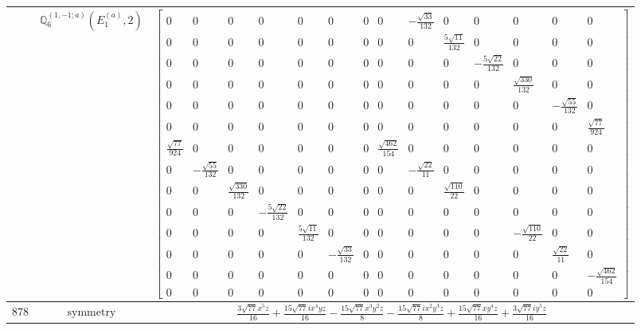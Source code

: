 \documentclass[fleqn,8pt,landscape]{jsarticle}
\begin{document}
\begin{longtable}{ccc}
$  $ & $ \mathbb{Q}_{6}^{(1,-1;a)}(E_{1}^{(a)},2) $ & $ \begin{bmatrix} 0 & 0 & 0 & 0 & 0 & 0 & 0 & 0 & - \frac{\sqrt{33}}{132} & 0 & 0 & 0 & 0 & 0 \\ 0 & 0 & 0 & 0 & 0 & 0 & 0 & 0 & 0 & \frac{5 \sqrt{11}}{132} & 0 & 0 & 0 & 0 \\ 0 & 0 & 0 & 0 & 0 & 0 & 0 & 0 & 0 & 0 & - \frac{5 \sqrt{22}}{132} & 0 & 0 & 0 \\ 0 & 0 & 0 & 0 & 0 & 0 & 0 & 0 & 0 & 0 & 0 & \frac{\sqrt{330}}{132} & 0 & 0 \\ 0 & 0 & 0 & 0 & 0 & 0 & 0 & 0 & 0 & 0 & 0 & 0 & - \frac{\sqrt{55}}{132} & 0 \\ 0 & 0 & 0 & 0 & 0 & 0 & 0 & 0 & 0 & 0 & 0 & 0 & 0 & \frac{\sqrt{77}}{924} \\ \frac{\sqrt{77}}{924} & 0 & 0 & 0 & 0 & 0 & 0 & \frac{\sqrt{462}}{154} & 0 & 0 & 0 & 0 & 0 & 0 \\ 0 & - \frac{\sqrt{55}}{132} & 0 & 0 & 0 & 0 & 0 & 0 & - \frac{\sqrt{22}}{11} & 0 & 0 & 0 & 0 & 0 \\ 0 & 0 & \frac{\sqrt{330}}{132} & 0 & 0 & 0 & 0 & 0 & 0 & \frac{\sqrt{110}}{22} & 0 & 0 & 0 & 0 \\ 0 & 0 & 0 & - \frac{5 \sqrt{22}}{132} & 0 & 0 & 0 & 0 & 0 & 0 & 0 & 0 & 0 & 0 \\ 0 & 0 & 0 & 0 & \frac{5 \sqrt{11}}{132} & 0 & 0 & 0 & 0 & 0 & 0 & - \frac{\sqrt{110}}{22} & 0 & 0 \\ 0 & 0 & 0 & 0 & 0 & - \frac{\sqrt{33}}{132} & 0 & 0 & 0 & 0 & 0 & 0 & \frac{\sqrt{22}}{11} & 0 \\ 0 & 0 & 0 & 0 & 0 & 0 & 0 & 0 & 0 & 0 & 0 & 0 & 0 & - \frac{\sqrt{462}}{154} \\ 0 & 0 & 0 & 0 & 0 & 0 & 0 & 0 & 0 & 0 & 0 & 0 & 0 & 0 \end{bmatrix} $ \\ \hline
$ 878 $ & $ \text{symmetry} $ & $ \frac{3 \sqrt{77} x^{5} z}{16} + \frac{15 \sqrt{77} i x^{4} y z}{16} - \frac{15 \sqrt{77} x^{3} y^{2} z}{8} - \frac{15 \sqrt{77} i x^{2} y^{3} z}{8} + \frac{15 \sqrt{77} x y^{4} z}{16} + \frac{3 \sqrt{77} i y^{5} z}{16} $ \\

\end{longtable}
\end{document}
